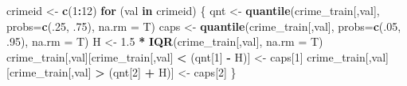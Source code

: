 \documentclass[3p]{elsarticle} %
\newenvironment{Shaded}{\begin{snugshade}}{\end{snugshade}}
\newcommand{\CommentTok}[1]{\textcolor[rgb]{0.56,0.35,0.01}{\textit{#1}}}
\newcommand{\ControlFlowTok}[1]{\textcolor[rgb]{0.13,0.29,0.53}{\textbf{#1}}}
\newcommand{\DataTypeTok}[1]{\textcolor[rgb]{0.13,0.29,0.53}{#1}}
\newcommand{\DecValTok}[1]{\textcolor[rgb]{0.00,0.00,0.81}{#1}}
\newcommand{\FloatTok}[1]{\textcolor[rgb]{0.00,0.00,0.81}{#1}}
\newcommand{\KeywordTok}[1]{\textcolor[rgb]{0.13,0.29,0.53}{\textbf{#1}}}
\newcommand{\NormalTok}[1]{#1}
\newcommand{\OperatorTok}[1]{\textcolor[rgb]{0.81,0.36,0.00}{\textbf{#1}}}
\newcommand{\StringTok}[1]{\textcolor[rgb]{0.31,0.60,0.02}{#1}}
\begin{document}
\begin{Shaded}
\end{Shaded}

\begin{Shaded}
\begin{Highlighting}[]
\NormalTok{crimeid <-}\StringTok{ }\KeywordTok{c}\NormalTok{(}\DecValTok{1}\OperatorTok{:}\DecValTok{12}\NormalTok{)}
\ControlFlowTok{for}\NormalTok{ (val }\ControlFlowTok{in}\NormalTok{ crimeid) \{}
\NormalTok{  qnt <-}\StringTok{ }\KeywordTok{quantile}\NormalTok{(crime_train[,val], }\DataTypeTok{probs=}\KeywordTok{c}\NormalTok{(.}\DecValTok{25}\NormalTok{, }\FloatTok{.75}\NormalTok{), }\DataTypeTok{na.rm =}\NormalTok{ T)}
\NormalTok{  caps <-}\StringTok{ }\KeywordTok{quantile}\NormalTok{(crime_train[,val], }\DataTypeTok{probs=}\KeywordTok{c}\NormalTok{(.}\DecValTok{05}\NormalTok{, }\FloatTok{.95}\NormalTok{), }\DataTypeTok{na.rm =}\NormalTok{ T)}
\NormalTok{  H <-}\StringTok{ }\FloatTok{1.5} \OperatorTok{*}\StringTok{ }\KeywordTok{IQR}\NormalTok{(crime_train[,val], }\DataTypeTok{na.rm =}\NormalTok{ T)}
\NormalTok{  crime_train[,val][crime_train[,val] }\OperatorTok{<}\StringTok{ }\NormalTok{(qnt[}\DecValTok{1}\NormalTok{] }\OperatorTok{-}\StringTok{ }\NormalTok{H)] <-}\StringTok{ }\NormalTok{caps[}\DecValTok{1}\NormalTok{]}
\NormalTok{  crime_train[,val][crime_train[,val] }\OperatorTok{>}\StringTok{ }\NormalTok{(qnt[}\DecValTok{2}\NormalTok{] }\OperatorTok{+}\StringTok{ }\NormalTok{H)] <-}\StringTok{ }\NormalTok{caps[}\DecValTok{2}\NormalTok{]}
\NormalTok{\}}
\end{Highlighting}
\end{Shaded}

\begin{Shaded}
\end{Shaded}
\end{document}
